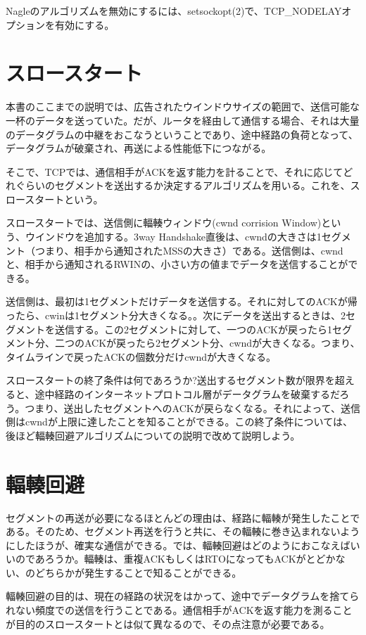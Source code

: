 Nagleのアルゴリズムを無効にするには、setsockopt(2)で、TCP\_NODELAYオプションを有効にする。

\section{スロースタート}

本書のここまでの説明では、広告されたウインドウサイズの範囲で、送信可能な一杯のデータを送っていた。だが、ルータを経由して通信する場合、それは大量のデータグラムの中継をおこなうということであり、途中経路の負荷となって、データグラムが破棄され、再送による性能低下につながる。

そこで、TCPでは、通信相手がACKを返す能力を計ることで、それに応じてどれぐらいのセグメントを送出するか決定するアルゴリズムを用いる。これを、スロースタートという。

スロースタートでは、送信側に輻輳ウィンドウ(cwnd corrision Window)という、ウインドウを追加する。3way Handshake直後は、cwndの大きさは1セグメント（つまり、相手から通知されたMSSの大きさ）である。送信側は、cwndと、相手から通知されるRWINの、小さい方の値までデータを送信することができる。

送信側は、最初は1セグメントだけデータを送信する。それに対してのACKが帰ったら、cwinは1セグメント分大きくなる。。次にデータを送出するときは、2セグメントを送信する。この2セグメントに対して、一つのACKが戻ったら1セグメント分、二つのACKが戻ったら2セグメント分、cwndが大きくなる。つまり、タイムラインで戻ったACKの個数分だけcwndが大きくなる。

スロースタートの終了条件は何であろうか?送出するセグメント数が限界を超えると、途中経路のインターネットプロトコル層がデータグラムを破棄するだろう。つまり、送出したセグメントへのACKが戻らなくなる。それによって、送信側はcwndが上限に達したことを知ることができる。この終了条件については、後ほど輻輳回避アルゴリズムについての説明で改めて説明しよう。

\section{輻輳回避}

セグメントの再送が必要になるほとんどの理由は、経路に輻輳が発生したことである。そのため、セグメント再送を行うと共に、その輻輳に巻き込まれないようにしたほうが、確実な通信ができる。では、輻輳回避はどのようにおこなえばいいのであろうか。輻輳は、重複ACKもしくはRTOになってもACKがとどかない、のどちらかが発生することで知ることができる。

輻輳回避の目的は、現在の経路の状況をはかって、途中でデータグラムを捨てられない頻度での送信を行うことである。通信相手がACKを返す能力を測ることが目的のスロースタートとは似て異なるので、その点注意が必要である。

